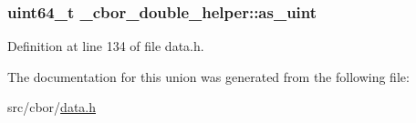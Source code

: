 \hypertarget{union__cbor__double__helper_a247647c22dd8248e513c37b0b339b856}{
\subsubsection[{as\-\_\-uint}]{\setlength{\rightskip}{0pt plus 5cm}uint64\-\_\-t \-\_\-cbor\-\_\-double\-\_\-helper\-::as\-\_\-uint}}\label{union__cbor__double__helper_a247647c22dd8248e513c37b0b339b856}


Definition at line 134 of file data.\-h.



The documentation for this union was generated from the following file\-:\begin{DoxyCompactItemize}
\item 
src/cbor/\hyperlink{data_8h}{data.\-h}\end{DoxyCompactItemize}
